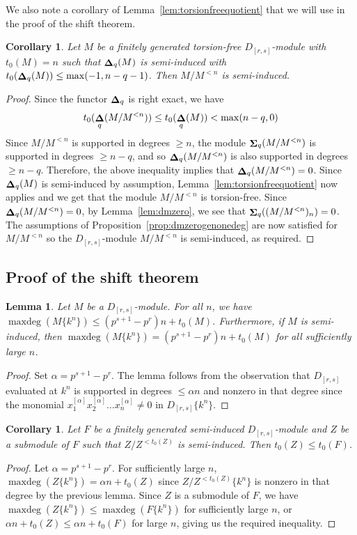 \documentclass[12pt]{amsart}
\DeclareMathOperator{\Sh}{\bf{\Sigma}}
\DeclareMathOperator{\De}{\bf{\Delta}}
\newcommand{\Drs}{D_{[r,s]}}
\newcommand{\mShq}{\Sh_{q}}
\newcommand{\mDeq}{\De_{q}}
\DeclareMathOperator{\maxdeg}{{maxdeg}}
\numberwithin{equation}{section}
\newtheorem{lemma}[equation]{Lemma}
\newtheorem{corollary}[equation]{Corollary}
\theoremstyle{definition}
\theoremstyle{plain}
\begin{document}
We also note a corollary of Lemma~\ref{lem:torsionfreequotient} that we will use in the proof of the shift theorem.
\begin{corollary}
 \label{cor:dqlowdeg}
     Let $M$ be a finitely generated torsion-free $\Drs$-module with $t_0(M) = n$ such that $\mDeq(M)$ is semi-induced with $t_0(\mDeq(M)) \leq \max(-1, n - q - 1)$. Then $M/M^{<n}$ is semi-induced. 
 \end{corollary}
 \begin{proof}
     Since the functor $\mDeq$ is right exact, we have \begin{displaymath}
     t_0(\mDeq(M/M^{<n})) \le t_0(\mDeq(M)) < \max(n-{q},0)
     \end{displaymath}
     Since $M/M^{<n}$ is supported in degrees $\ge n$, the module $\mShq(M/M^{<n})$ is supported in degrees $\ge n-{q}$, and so $\mDeq(M/M^{<n})$ is also supported in degrees $\geq n-{q}$. Therefore, the above inequality implies that $\mDeq(M/M^{<n}) = 0$. Since $\mDeq(M)$ is semi-induced by assumption, Lemma~\ref{lem:torsionfreequotient} now applies and we get that the module $M/M^{<n}$ is torsion-free. Since $\mDeq(M/M^{<n}) = 0$, by Lemma~\ref{lem:dmzero}, we see that $\mShq((M/M^{<n})_n) = 0$. The assumptions of Proposition~\ref{prop:dmzerogenonedeg} are now satisfied for $M/M^{<n}$ so the $\Drs$-module $M/M^{<n}$ is semi-induced, as required.
 \end{proof}


\subsection{Proof of the shift theorem}\label{ss:proofshift}

\begin{lemma}
	Let $M$ be a $\Drs$-module. For all $n$, we have $\maxdeg(M\{k^n\}) \leq (p^{s+1}-p^r)n + t_0(M)$. Furthermore, if $M$ is semi-induced, then $\maxdeg(M\{k^n\}) = {(p^{s+1}-p^r)n + t_0(M)}$ for all sufficiently large $n$.
\end{lemma}
\begin{proof}
    Set $\alpha = p^{s+1} - p^r$. The lemma follows from the observation that $\Drs$ evaluated at $k^n$ is supported in degrees $ \leq \alpha n$ and nonzero in that degree since the monomial $x_1^{[\alpha]} x_2^{[\alpha]} \ldots x_n^{[\alpha]} \ne 0$ in $\Drs\{k^n\}$. 
\end{proof}


\begin{corollary}\label{cor:subsemi}
Let $F$ be a finitely generated semi-induced $\Drs$-module and $Z$ be a submodule of $F$ such that $Z/Z^{< t_0(Z)}$ is semi-induced. Then $t_0(Z) \leq t_0(F)$.
\end{corollary}
\begin{proof}
Let $\alpha = p^{s+1} - p^r$. For sufficiently large $n$, $\maxdeg(Z\{k^n\}) = \alpha n + t_0(Z)$ since $Z/Z^{< t_0(Z)}\{k^n\}$ is nonzero in that degree by the previous lemma. Since $Z$ is a submodule of $F$, we have $\maxdeg(Z\{k^n\}) \le \maxdeg(F\{k^n\})$ for sufficiently large $n$, or $\alpha n + t_0(Z) \leq \alpha n + t_0(F)$ for large $n$, giving us the required inequality.
\end{proof} 
\end{document}
